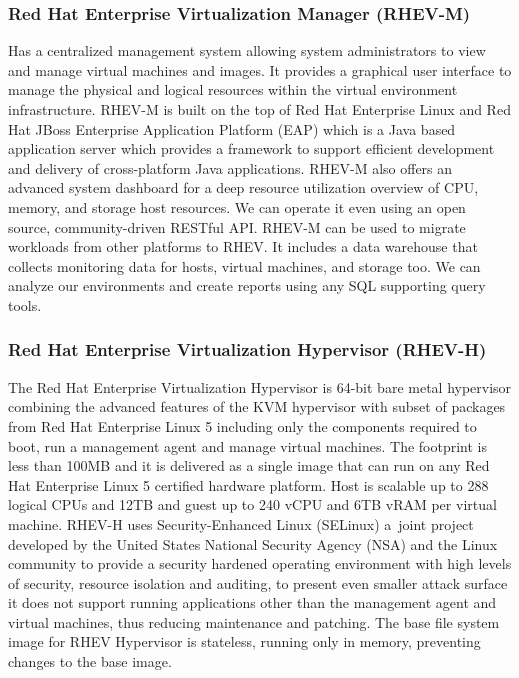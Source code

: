 \subsubsection{Red Hat Enterprise Virtualization Manager (RHEV-M)}
Has a centralized management system allowing system administrators to view and manage virtual machines and images. It provides a graphical user interface to manage the physical and logical resources within the virtual environment infrastructure. RHEV-M is built on the top of Red Hat Enterprise Linux and Red Hat JBoss Enterprise Application Platform (EAP) which is a Java based application server which provides a framework to support efficient development and delivery of cross-platform Java applications. RHEV-M also offers an advanced system dashboard for a deep resource utilization overview of CPU, memory, and storage host resources. We can operate it even using an open source, community-driven RESTful API. RHEV-M can be used to migrate workloads from other platforms to RHEV. It includes a data warehouse that collects monitoring data for hosts, virtual machines, and storage too. We can analyze our environments and create reports using any SQL supporting query tools.


\subsubsection{Red Hat Enterprise Virtualization Hypervisor (RHEV-H)}
The Red Hat Enterprise Virtualization Hypervisor is 64-bit bare metal hypervisor combining the advanced features of the KVM hypervisor with subset of packages from Red Hat Enterprise Linux 5 including only the components required to boot, run a management agent and manage virtual machines. The footprint is less than 100MB and it is delivered as a single image that can run on any Red Hat Enterprise Linux 5 certified hardware platform. Host is scalable up to 288 logical CPUs and 12TB and guest up to 240 vCPU and 6TB vRAM per virtual machine. RHEV-H uses Security-Enhanced Linux (SELinux) a~joint project developed by the United States National Security Agency (NSA) and the Linux community to provide a security hardened operating environment with high levels of security, resource isolation and auditing, to present even smaller attack surface it does not support running applications other than the management agent and virtual machines, thus reducing maintenance and patching. The base file system image for RHEV Hypervisor is stateless, running only in memory, preventing changes to the base image.


